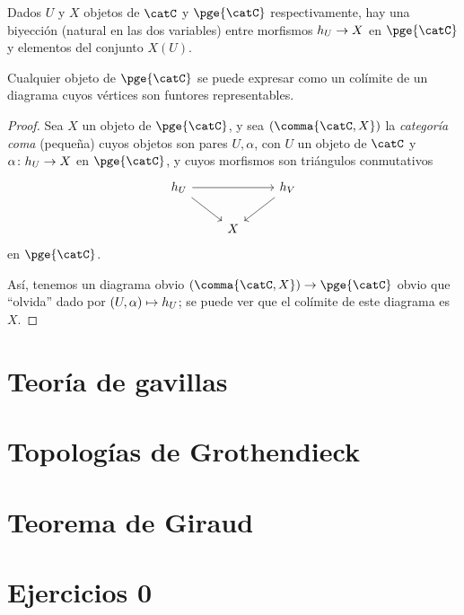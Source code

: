 \begin{lemma}[label={0.11},note={Yoneda \pend{[187]}},short-note={Yoneda}]
  Dados \(U\) y \(X\) objetos de \(\catC\) y \(\pge{\catC}\) respectivamente,
  hay una biyección (natural en las dos variables) entre morfismos \(h_U\to X\)
  en \(\pge{\catC}\) y elementos del conjunto \(X(U)\).
\end{lemma}

\begin{lemma}
  Cualquier objeto de \(\pge{\catC}\) se puede expresar como un colímite de un
  diagrama cuyos vértices son funtores representables.
\end{lemma}
\begin{proof}
  Sea \(X\) un objeto de \(\pge{\catC}\), y sea \((\comma{\catC,X})\) la
  \emph{categoría coma} (pequeña) cuyos objetos son pares \(U,\alpha\), con
  \(U\) un objeto de \(\catC\) y \(\alpha\colon h_U \to X\) en \(\pge{\catC}\),
  y cuyos morfismos son triángulos conmutativos
  \begin{equation*}
    \begin{tikzcd}
      \gy_U \ar{rr}\ar{rd} && \gy_V\ar{ld} \\
      & X
    \end{tikzcd}
  \end{equation*}
  en \(\pge{\catC}\).

  Así, tenemos un diagrama obvio \((\comma{\catC,X})\to\pge{\catC}\) obvio que
  \enquote{olvida} dado por \((U,\alpha)\mapsto h_U\); se puede ver que el
  colímite de este diagrama es \(X\).
\end{proof}


\section{Teoría de gavillas}
\label{sec:0.2}

\section{Topologías de Grothendieck}
\label{sec:0.3}

\section{Teorema de Giraud}
\label{sec:0.4}

\section*{Ejercicios 0}
\label{sec:ejercicios-0}
